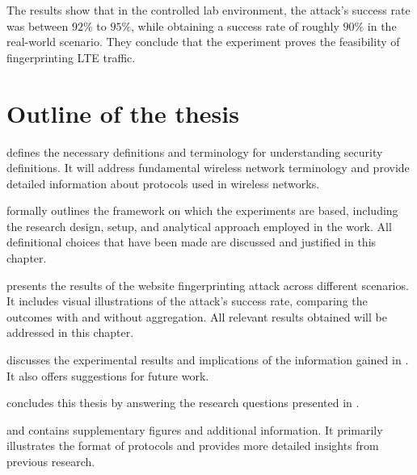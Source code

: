 The results \cite{kohls2019lost} show that in the controlled lab environment, the attack's success rate was between $92\%$ to $95\%$, while obtaining a success rate of roughly $90\%$ in the real-world scenario. They conclude that the experiment proves the feasibility of fingerprinting LTE traffic.

\clearpage

\section{Outline of the thesis\label{sec:outline-intro}}

 defines the necessary definitions and terminology for understanding security definitions. It will address fundamental wireless network terminology and provide detailed information about protocols used in wireless networks.

 formally outlines the framework on which the experiments are based, including the research design, setup, and analytical approach employed in the work. All definitional choices that have been made are discussed and justified in this chapter.

 presents the results of the website fingerprinting attack across different scenarios. It includes visual illustrations of the attack's success rate, comparing the outcomes with and without aggregation. All relevant results obtained will be addressed in this chapter.

 discusses the experimental results and implications of the information gained in . It also offers suggestions for future work.

 concludes this thesis by answering the research questions presented in  .

 and  contains supplementary figures and additional information. It primarily illustrates the format of protocols and provides more detailed insights from previous research.
